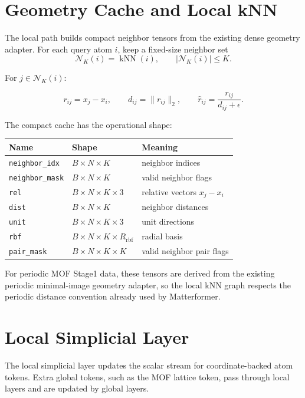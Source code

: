 \documentclass[11pt]{article}
\begin{document}
\section{Geometry Cache and Local kNN}

The local path builds compact neighbor tensors from the existing dense geometry
adapter.  For each query atom \(i\), keep a fixed-size neighbor set
\[
  \mathcal{N}_K(i)
  =
  \operatorname{kNN}(i),
  \qquad
  |\mathcal{N}_K(i)| \le K.
\]

For \(j \in \mathcal{N}_K(i)\):

\[
  r_{ij} = x_j - x_i,
  \qquad
  d_{ij} = \|r_{ij}\|_2,
  \qquad
  \hat r_{ij} = \frac{r_{ij}}{d_{ij}+\epsilon}.
\]

The compact cache has the operational shape:

\begin{center}
\begin{tabular}{lll}
\toprule
Name & Shape & Meaning \\
\midrule
\texttt{neighbor\_idx} & \(B\times N\times K\) & neighbor indices \\
\texttt{neighbor\_mask} & \(B\times N\times K\) & valid neighbor flags \\
\texttt{rel} & \(B\times N\times K\times 3\) & relative vectors \(x_j-x_i\) \\
\texttt{dist} & \(B\times N\times K\) & neighbor distances \\
\texttt{unit} & \(B\times N\times K\times 3\) & unit directions \\
\texttt{rbf} & \(B\times N\times K\times R_{\mathrm{rbf}}\) & radial basis \\
\texttt{pair\_mask} & \(B\times N\times K\times K\) & valid neighbor pair flags \\
\bottomrule
\end{tabular}
\end{center}

For periodic MOF Stage1 data, these tensors are derived from the existing
periodic minimal-image geometry adapter, so the local kNN graph respects the
periodic distance convention already used by Matterformer.

\section{Local Simplicial Layer}

The local simplicial layer updates the scalar stream for coordinate-backed atom
tokens.  Extra global tokens, such as the MOF lattice token, pass through local
layers and are updated by global layers.
\end{document}
